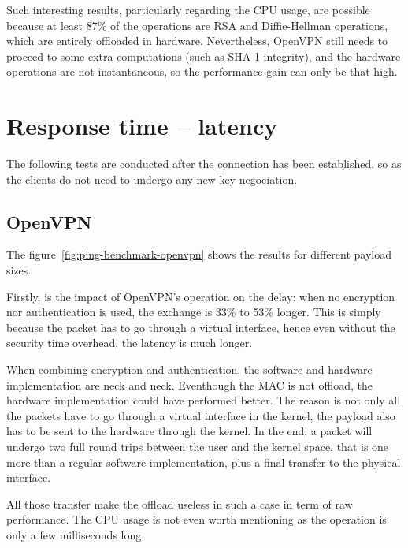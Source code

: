 Such interesting results, particularly regarding the CPU usage, are possible because at least 87\% of the operations are RSA and Diffie-Hellman operations, which are entirely offloaded in hardware.
Nevertheless, OpenVPN still needs to proceed to some extra computations (such as SHA-1 integrity), and the hardware operations are not instantaneous, so the performance gain can only be that high.












\section{Response time -- latency}
The following tests are conducted after the connection has been established, so as the clients do not need to undergo any new key negociation.

\subsection{OpenVPN}
The figure~\ref{fig:ping-benchmark-openvpn} shows the results for different payload sizes.

\noindent Firstly, is the impact of OpenVPN's operation on the delay: when no encryption nor authentication is used, the exchange is 33\% to 53\% longer. This is simply because the packet has to go through a virtual interface, hence even without the security time overhead, the latency is much longer.

When combining encryption and authentication, the software and hardware implementation are neck and neck.
Eventhough the MAC is not offload, the hardware implementation could have performed better.
The reason is not only all the packets have to go through a virtual interface in the kernel, the payload also has to be sent to the hardware through the kernel.
In the end, a packet will undergo two full round trips between the user and the kernel space, that is one more than a regular software implementation, plus a final transfer to the physical interface.

\noindent All those transfer make the offload useless in such a case in term of raw performance.
The CPU usage is not even worth mentioning as the operation is only a few milliseconds long.


